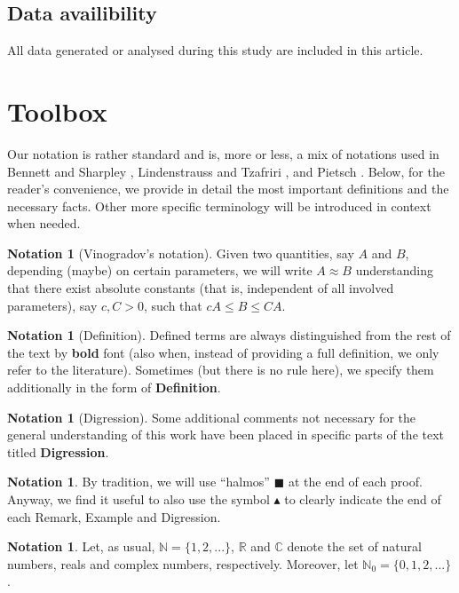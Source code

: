 \documentclass[11pt]{amsart}
\theoremstyle{definition}
\theoremstyle{definition}
\theoremstyle{definition}
\theoremstyle{definition}
\theoremstyle{definition}
\theoremstyle{definition}
\theoremstyle{definition}
\theoremstyle{definition}
\numberwithin{equation}{section}
\numberwithin{equation}{section}
\numberwithin{equation}{section}
\theoremstyle{definition}
\theoremstyle{definition}
\newtheorem{notation}[theorem]{Notation}
\theoremstyle{definition}
\theoremstyle{definition}
\theoremstyle{definition}
\theoremstyle{definition}
\begin{document}
\subsection{Data availibility}
All data generated or analysed during this study are included in this article.

\section{{\bf Toolbox}} \label{SECTION: Toolbox}

Our notation is rather standard and is, more or less, a mix of notations used in Bennett and Sharpley \cite{BS88},
Lindenstrauss and Tzafriri \cite{LT77}, \cite{LT79} and Pietsch \cite{Pie80}.
Below, for the reader's convenience, we provide in detail the most important definitions and the necessary facts.
Other more specific terminology will be introduced in context when needed.

\begin{notation}[Vinogradov's notation]
	Given two quantities, say $A$ and $B$, depending (maybe) on certain parameters, we will write $A \approx B$ understanding that there exist
	absolute constants (that is, independent of all involved parameters), say $c, C > 0$, such that $cA \leqslant B \leqslant CA$.
\end{notation}

\begin{notation}[Definition]
	Defined terms are always distinguished from the rest of the text by {\bf bold} font (also when, instead of providing a full definition,
	we only refer to the literature). Sometimes (but there is no rule here), we specify them additionally in the form of {\bf Definition}.
\end{notation}

\begin{notation}[Digression]
	Some additional comments not necessary for the general understanding of this work have been placed in specific
	parts of the text titled {\bf Digression}.
\end{notation}

\begin{notation}
	By tradition, we will use \enquote{halmos} $\blacksquare$ at the end of each proof. Anyway, we find it useful to also use the symbol
	{\large $\blacktriangle$} to clearly indicate the end of each Remark, Example and Digression.
\end{notation}

\begin{notation}
	Let, as usual, $\mathbb{N} = \{1,2, ...\}$, $\mathbb{R}$ and $\mathbb{C}$ denote the set of natural numbers,
	reals and complex numbers, respectively. Moreover, let $\mathbb{N}_0 = \{0, 1, 2, ...\}$.
\end{notation}
\end{document}
